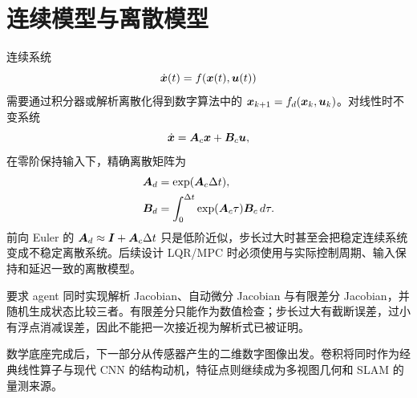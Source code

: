 \section{连续模型与离散模型}

连续系统
\begin{equation}
  \dot{\bm{x}}(t)=f(\bm{x}(t),\bm{u}(t))
\end{equation}
需要通过积分器或解析离散化得到数字算法中的 $\bm{x}_{k+1}=f_d(\bm{x}_k,\bm{u}_k)$。对线性时不变系统
\begin{equation}
  \dot{\bm{x}}=\bm{A}_c\bm{x}+\bm{B}_c\bm{u},
\end{equation}
在零阶保持输入下，精确离散矩阵为
\begin{align}
  \bm{A}_d &= \exp(\bm{A}_c\Delta t),\\
  \bm{B}_d &= \int_0^{\Delta t}\exp(\bm{A}_c\tau)\bm{B}_c\,d\tau.
\end{align}
前向 Euler 的 $\bm{A}_d\approx\bm{I}+\bm{A}_c\Delta t$ 只是低阶近似，步长过大时甚至会把稳定连续系统变成不稳定离散系统。后续设计 LQR/MPC 时必须使用与实际控制周期、输入保持和延迟一致的离散模型。

\begin{aiverify}
要求 agent 同时实现解析 Jacobian、自动微分 Jacobian 与有限差分 Jacobian，并随机生成状态比较三者。有限差分只能作为数值检查；步长过大有截断误差，过小有浮点消减误差，因此不能把一次接近视为解析式已被证明。
\end{aiverify}

\begin{chaptertransition}
数学底座完成后，下一部分从传感器产生的二维数字图像出发。卷积将同时作为经典线性算子与现代 CNN 的结构动机，特征点则继续成为多视图几何和 SLAM 的量测来源。
\end{chaptertransition}


